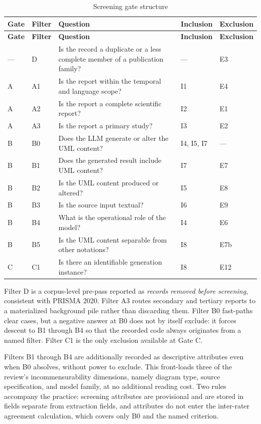 \begin{longtable}{p{} p{} p{} p{} p{}}
\caption{Screening gate structure}
\label{tab:protocol_gates}\\
\toprule
\textbf{Gate} & \textbf{Filter} & \textbf{Question} & \textbf{Inclusion} & \textbf{Exclusion} \\
\midrule
\endfirsthead
\toprule
\textbf{Gate} & \textbf{Filter} & \textbf{Question} & \textbf{Inclusion} & \textbf{Exclusion} \\
\midrule
\endhead
--- & D & Is the record a duplicate or a less complete member of a publication family? & --- & E3 \\
A & A1 & Is the report within the temporal and language scope? & I1 & E4 \\
A & A2 & Is the report a complete scientific report? & I2 & E1 \\
A & A3 & Is the report a primary study? & I3 & E2 \\
B & B0 & Does the LLM generate or alter the UML content? & I4, I5, I7 & --- \\
B & B1 & Does the generated result include UML content? & I7 & E7 \\
B & B2 & Is the UML content produced or altered? & I5 & E8 \\
B & B3 & Is the source input textual? & I6 & E9 \\
B & B4 & What is the operational role of the model? & I4 & E6 \\
B & B5 & Is the UML content separable from other notations? & I8 & E7b \\
C & C1 & Is there an identifiable generation instance? & I8 & E12 \\
\bottomrule
\end{longtable}

Filter D is a corpus-level pre-pass reported as \textit{records removed before screening}, consistent with PRISMA 2020. Filter A3 routes secondary and tertiary reports to a materialized background pile rather than discarding them. Filter B0 fast-paths clear cases, but a negative answer at B0 does not by itself exclude: it forces descent to B1 through B4 so that the recorded code always originates from a named filter. Filter C1 is the only exclusion available at Gate C.

Filters B1 through B4 are additionally recorded as descriptive attributes even when B0 absolves, without power to exclude. This front-loads three of the review's incommensurability dimensions, namely diagram type, source specification, and model family, at no additional reading cost. Two rules accompany the practice: screening attributes are provisional and are stored in fields separate from extraction fields, and attributes do not enter the inter-rater agreement calculation, which covers only B0 and the named criterion.

